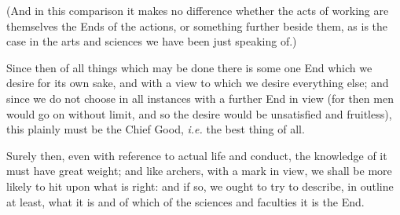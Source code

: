 (And in this comparison it makes no difference whether the acts of working are
themselves the Ends of the actions, or something further beside them, as is the
case in the arts and sciences we have been just speaking of.)

Since then of all things which may be done there is some one End which we
desire for its own sake, and with a view to which we desire everything else;
and since we do not choose in all instances with a further End in view (for
then men would go on without limit, and so the desire would be unsatisfied and
fruitless), this plainly must be the Chief Good, \emph{i.e.} the best thing of
all.

Surely then, even with reference to actual life and conduct, the knowledge of
it must have great weight; and like archers, with a mark in view, we shall be
more likely to hit upon what is right: and if so, we ought to try to describe,
in outline at least, what it is and of which of the sciences and faculties it
is the End.

